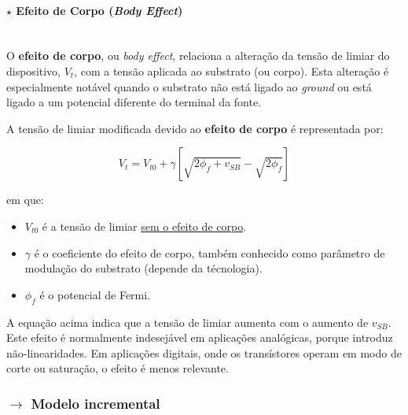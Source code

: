 \newpage
\paragraph[3.2.1.3 Efeito de Corpo]{$\pmb{\star}$ Efeito de Corpo (\textit{Body Effect})}\mbox{}\\[4pt]
O \textbf{efeito de corpo}, ou \textit{body effect}, relaciona a alteração da tensão de limiar do dispositivo, $V_t$, com a tensão aplicada ao substrato (ou corpo). Esta alteração é especialmente notável quando o substrato não está ligado ao \textit{ground} ou está ligado a um potencial diferente do terminal da fonte.

\begin{mdframed}
    \noindent A tensão de limiar modificada devido ao \textbf{efeito de corpo} é representada por:
    
    $$
        \boxed{ V_t = V_{t0} + \gamma \left[ \sqrt{{2\phi_f + v_{SB}}} - \sqrt{{2\phi_f}} \right] }
    $$
    
    \noindent em que:
    \begin{itemize}[noitemsep, nolistsep]
        \item $V_{t0}$ é a tensão de limiar \underline{sem o efeito de corpo}.
        \item $\gamma$ é o coeficiente do efeito de corpo, também conhecido como parâmetro de modulação do substrato (depende da técnologia).
        \item $\phi_f$ é o potencial de Fermi.
    \end{itemize}
    
    \vspace{0.5em}
    \noindent A equação acima indica que a tensão de limiar aumenta com o aumento de $v_{SB}$. Este efeito é normalmente indesejável em aplicações analógicas, porque introduz não-linearidades. Em aplicações digitais, onde os transístores operam em modo de corte ou saturação, o efeito é menos relevante.
\end{mdframed}

\subsubsection[3.2.2 Modelo incremental]{$\pmb{\rightarrow}$ Modelo incremental}

